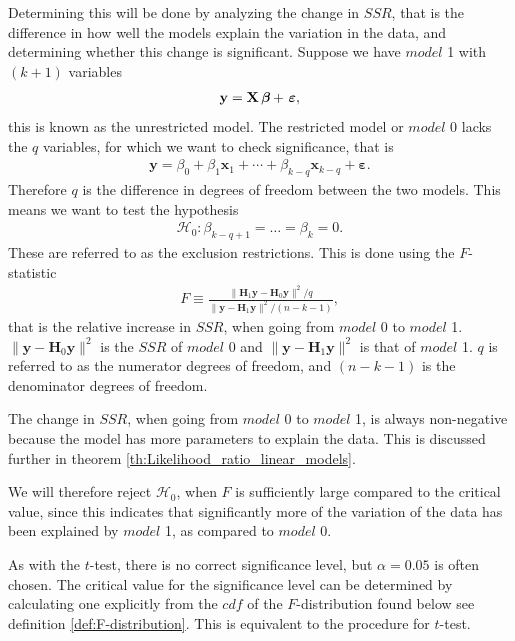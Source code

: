 Determining this will be done by analyzing the change in $SSR$, that is the difference in how well the models explain the variation in the data, and determining whether this change is significant. 
Suppose we have $model$ 1 with $(k+1)$ variables 
\begin{align*}
    \textbf{y} = \textbf{X}\operatorname{\boldsymbol{\beta}} +\ \boldsymbol{\varepsilon},
\end{align*}
this is known as the unrestricted model. The restricted model or $model$ 0 lacks the $q$ variables, for which we want to check significance, that is
\begin{align*}
    \textbf{y} = \beta_0 + \beta_1 \textbf{x}_1 + \cdots + \beta_{k-q} \textbf{x}_{k-q} + \boldsymbol{\varepsilon}.
\end{align*}
Therefore $q$ is the difference in degrees of freedom between the two models.
This means we want to test the hypothesis
\begin{align}
    \mathcal{H}_0: \beta_{k-q+1} = \ldots = \beta_k = 0.
\end{align}
These are referred to as the exclusion restrictions. 
This is done using the $F$-statistic
\begin{align}\label{eq:F_statistic}
    F \equiv \frac{\| \textbf{H}_1 \textbf{y} - \textbf{H}_0 \textbf{y} \|^2/q}{\| \textbf{y} - \textbf{H}_1 \textbf{y} \|^2/(n-k-1)},
\end{align}
that is the relative increase in $SSR$, when going from $model$ 0 to $model$ 1. 
$\| \textbf{y} - \textbf{H}_0 \textbf{y} \|^2$ is the $SSR$ of $model$ 0 and $\| \textbf{y} - \textbf{H}_1 \textbf{y} \|^2$ is that of $model$ 1. 
$q$ is referred to as the numerator degrees of freedom, and $(n-k-1)$ is the denominator degrees of freedom. 

The change in $SSR$, when going from $model$ 0 to $model$ 1, is always non-negative because the model has more parameters to explain the data. 
This is discussed further in theorem \ref{th:Likelihood_ratio_linear_models}.

We will therefore reject $\mathcal{H}_0$, when $F$ is sufficiently large compared to the critical value, since this indicates that significantly more of the variation of the data has been explained by $model$ 1, as compared to $model$ 0.

As with the $t$-test, there is no correct significance level, but $\alpha = 0.05$ is often chosen. 
The critical value for the significance level can be determined by calculating one explicitly from the $cdf$ of the $F$-distribution found below see definition \ref{def:F-distribution}. 
This is equivalent to the procedure for $t$-test.

